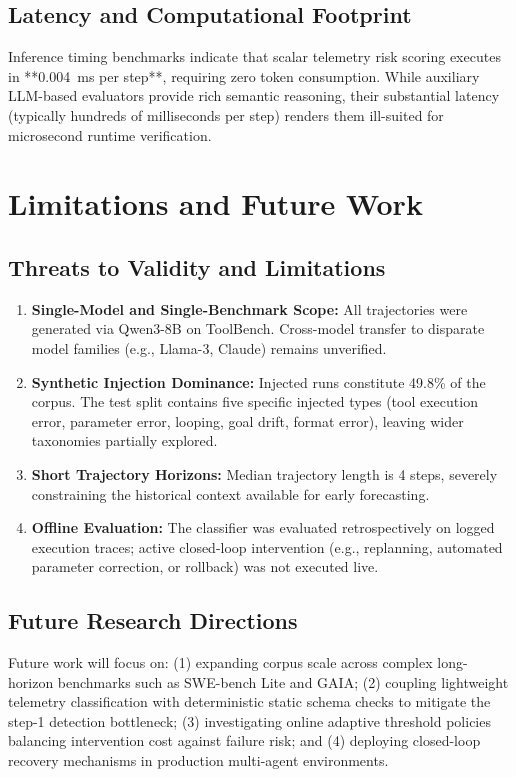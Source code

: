 \documentclass[journal,compsoc]{IEEEtran}
\begin{document}
\subsection{Latency and Computational Footprint}
Inference timing benchmarks indicate that scalar telemetry risk scoring executes in **0.004~ms per step**, requiring zero token consumption. While auxiliary LLM-based evaluators provide rich semantic reasoning, their substantial latency (typically hundreds of milliseconds per step) renders them ill-suited for microsecond runtime verification.

\section{Limitations and Future Work}

\subsection{Threats to Validity and Limitations}
\begin{enumerate}
    \item \textbf{Single-Model and Single-Benchmark Scope:} All trajectories were generated via Qwen3-8B on ToolBench. Cross-model transfer to disparate model families (e.g., Llama-3, Claude) remains unverified.
    \item \textbf{Synthetic Injection Dominance:} Injected runs constitute 49.8\% of the corpus. The test split contains five specific injected types (tool execution error, parameter error, looping, goal drift, format error), leaving wider taxonomies partially explored.
    \item \textbf{Short Trajectory Horizons:} Median trajectory length is 4 steps, severely constraining the historical context available for early forecasting.
    \item \textbf{Offline Evaluation:} The classifier was evaluated retrospectively on logged execution traces; active closed-loop intervention (e.g., replanning, automated parameter correction, or rollback) was not executed live.
\end{enumerate}

\subsection{Future Research Directions}
Future work will focus on: (1) expanding corpus scale across complex long-horizon benchmarks such as SWE-bench Lite and GAIA; (2) coupling lightweight telemetry classification with deterministic static schema checks to mitigate the step-1 detection bottleneck; (3) investigating online adaptive threshold policies balancing intervention cost against failure risk; and (4) deploying closed-loop recovery mechanisms in production multi-agent environments.
\end{document}
